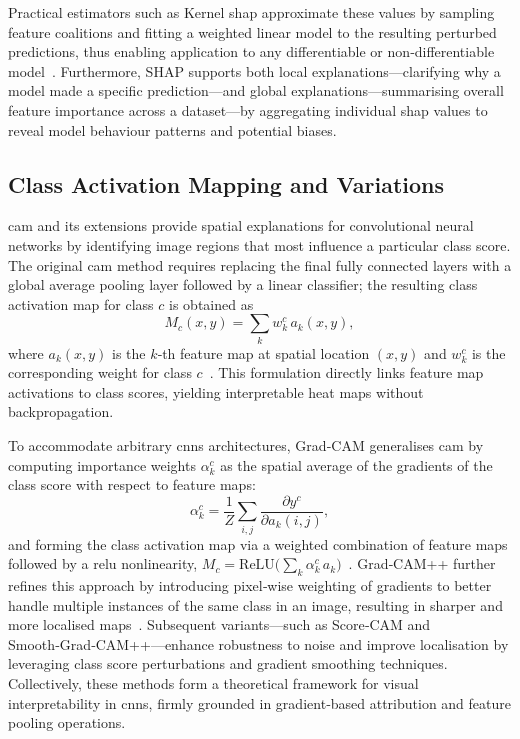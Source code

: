 Practical estimators such as Kernel \ac{shap} approximate these values by sampling feature coalitions and fitting a weighted linear model to the resulting perturbed predictions, thus enabling application to any differentiable or non‐differentiable model~\cite{lundberg_unified_2017}. Furthermore, SHAP supports both local explanations—clarifying why a model made a specific prediction—and global explanations—summarising overall feature importance across a dataset—by aggregating individual \ac{shap} values to reveal model behaviour patterns and potential biases.

\subsection{Class Activation Mapping and Variations}
\acf{cam} and its extensions provide spatial explanations for convolutional neural networks by identifying image regions that most influence a particular class score. The original \ac{cam} method requires replacing the final fully connected layers with a global average pooling layer followed by a linear classifier; the resulting class activation map for class \(c\) is obtained as
\[
M_c(x,y) = \sum_{k} w_k^c\,a_k(x,y),
\]
where \(a_k(x,y)\) is the \(k\)‑th feature map at spatial location \((x,y)\) and \(w_k^c\) is the corresponding weight for class \(c\)~\cite{zhou_learning_2016}. This formulation directly links feature map activations to class scores, yielding interpretable heat maps without backpropagation.

To accommodate arbitrary \acp{cnn} architectures, Grad‑CAM generalises \ac{cam} by computing importance weights \(\alpha_k^c\) as the spatial average of the gradients of the class score with respect to feature maps:
\[
\alpha_k^c = \frac{1}{Z}\sum_{i,j}\frac{\partial y^c}{\partial a_k(i,j)},
\] and forming the class activation map via a weighted combination of feature maps followed by a \ac{relu} nonlinearity, \(M_c = \mathrm{ReLU}\bigl(\sum_k \alpha_k^c\,a_k\bigr)\)~\cite{selvaraju_grad-cam_2017}. Grad‑CAM++ further refines this approach by introducing pixel‑wise weighting of gradients to better handle multiple instances of the same class in an image, resulting in sharper and more localised maps~\cite{chattopadhay_grad-cam_2018}. Subsequent variants—such as Score‑CAM and Smooth‑Grad‑CAM++—enhance robustness to noise and improve localisation by leveraging class score perturbations and gradient smoothing techniques. Collectively, these methods form a theoretical framework for visual interpretability in \acp{cnn}, firmly grounded in gradient‐based attribution and feature pooling operations.